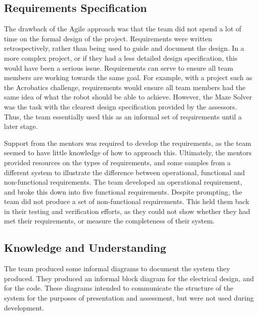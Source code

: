     \subsection{Requirements Specification}\label{subsec:technical-requirements}
        The drawback of the Agile approach was that the team did not spend a lot of time on the formal design of the project.
        Requirements were written retrospectively, rather than being used to guide and document the design.
        In a more complex project, or if they had a less detailed design specification, this would have been a serious issue.
        Requirements can serve to ensure all team members are working towards the same goal.
        For example, with a project such as the Acrobatics challenge, requirements would ensure all team members had the same idea of what the robot should be able to achieve.
        However, the Maze Solver was the task with the clearest design specification provided by the assessors.
        Thus, the team essentially used this as an informal set of requirements until a later stage.

        Support from the mentors was required to develop the requirements, as the team seemed to have little knowledge of how to approach this.
        Ultimately, the mentors provided resources on the types of requirements, and some samples from a different system to illustrate the difference between operational, functional and non-functional requirements.
        The team developed an operational requirement, and broke this down into five functional requirements.
        Despite prompting, the team did not produce a set of non-functional requirements.
        This held them back in their testing and verification efforts, as they could not show whether they had met their requirements, or measure the completeness of their system.

    \subsection{Knowledge and Understanding}\label{subsec:technical-knowledge}
        The team produced some informal diagrams to document the system they produced.
        They produced an informal block diagram for the electrical design, and for the code.
        These diagrams intended to communicate the structure of the system for the purposes of presentation and assessment, but were not used during development.

